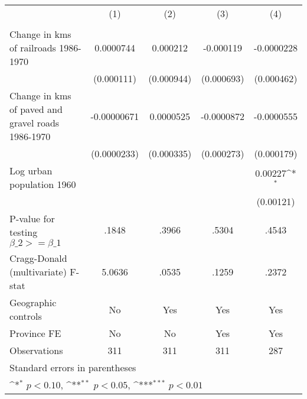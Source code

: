 {
\def\sym#1{\ifmmode^{#1}\else\(^{#1}\)\fi}
\begin{tabular}{l*{4}{c}}
\hline\hline
                &\multicolumn{1}{c}{(1)}&\multicolumn{1}{c}{(2)}&\multicolumn{1}{c}{(3)}&\multicolumn{1}{c}{(4)}\\
                &\multicolumn{1}{c}{}&\multicolumn{1}{c}{}&\multicolumn{1}{c}{}&\multicolumn{1}{c}{}\\
\hline
Change in kms of railroads 1986-1970&0.0000744         & 0.000212         &-0.000119         &-0.0000228         \\
                &(0.000111)         &(0.000944)         &(0.000693)         &(0.000462)         \\
[1em]
Change in kms of paved and gravel roads 1986-1970&-0.00000671         &0.0000525         &-0.0000872         &-0.0000555         \\
                &(0.0000233)         &(0.000335)         &(0.000273)         &(0.000179)         \\
[1em]
Log urban population 1960&                  &                  &                  &  0.00227\sym{*}  \\
                &                  &                  &                  &(0.00121)         \\
\hline
P-value for testing $\beta\_{2} >= \beta\_{1}$&    .1848         &    .3966         &    .5304         &    .4543         \\
Cragg-Donald (multivariate) F-stat&   5.0636         &    .0535         &    .1259         &    .2372         \\
Geographic controls&       No         &      Yes         &      Yes         &      Yes         \\
Province FE     &       No         &       No         &      Yes         &      Yes         \\
Observations    &      311         &      311         &      311         &      287         \\
\hline\hline
\multicolumn{5}{l}{\footnotesize Standard errors in parentheses}\\
\multicolumn{5}{l}{\footnotesize \sym{*} \(p<0.10\), \sym{**} \(p<0.05\), \sym{***} \(p<0.01\)}\\
\end{tabular}
}
